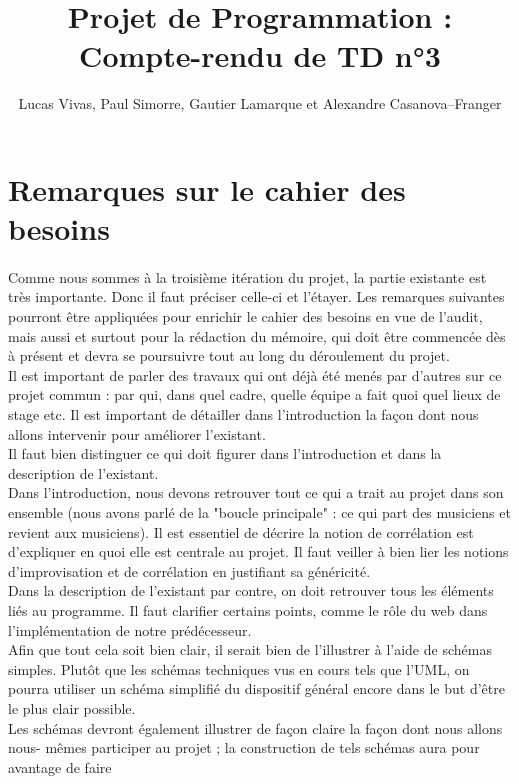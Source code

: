 \documentclass[a4paper]{article}
\title{Projet de Programmation : Compte-rendu de TD n°3}
\author{Lucas Vivas, Paul Simorre, Gautier Lamarque et Alexandre Casanova--Franger}
\begin{document}
\maketitle

\section*{Remarques sur le cahier des besoins}
\paragraph{}
Comme nous sommes à la troisième itération du projet, la partie existante est très
importante. Donc il faut préciser celle-ci et l'étayer. Les remarques suivantes
pourront être appliquées pour enrichir le cahier des besoins en vue de l'audit,
mais aussi et surtout pour la rédaction du mémoire, qui doit être commencée dès à
présent et devra se poursuivre tout au long du déroulement du projet. \\
Il est important de parler des travaux qui ont déjà été menés par d'autres sur ce
projet commun : par qui, dans quel cadre, quelle équipe a fait quoi quel
lieux de stage etc. Il est important de détailler dans l'introduction la façon
dont nous allons intervenir pour améliorer l'existant. \\
Il faut bien distinguer ce qui doit figurer dans l'introduction et
dans la description de l'existant.\\
Dans l'introduction, nous devons retrouver tout ce qui a trait au projet dans
son ensemble (nous avons parlé de la "boucle principale" : ce qui part des
musiciens et revient aux musiciens). Il est essentiel de décrire la notion de 
corrélation est d'expliquer en quoi elle est centrale au projet. Il faut veiller à
bien lier les notions d'improvisation et de corrélation en justifiant sa généricité. \\
Dans la description de l'existant par contre, on doit retrouver tous les
éléments liés au programme. Il faut clarifier certains points, comme le rôle du web
dans l'implémentation de notre prédécesseur. \\
Afin que tout cela soit bien clair, il serait bien de l'illustrer à l'aide de
schémas simples. Plutôt que les schémas techniques vus en cours tels que l'UML,
on pourra utiliser un schéma simplifié du dispositif général encore dans le but
d'être le plus clair possible. \\
Les schémas devront également illustrer de façon claire la façon dont nous allons nous-
mêmes participer au projet ; la construction de tels schémas aura pour avantage de faire
\end{document}
